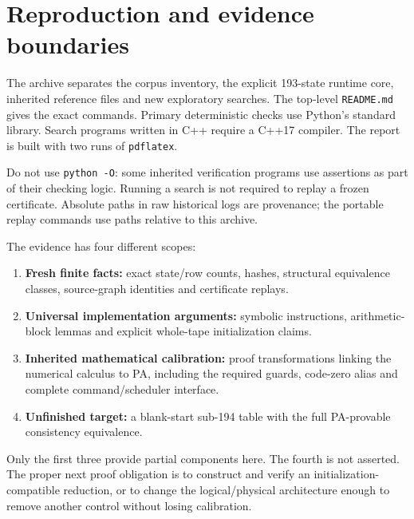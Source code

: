 \documentclass[11pt,letterpaper]{article}
\newcommand{\file}[1]{\texttt{\nolinkurl{#1}}}
\begin{document}
\section{Reproduction and evidence boundaries}

The archive separates the corpus inventory, the explicit 193-state runtime
core, inherited reference files and new exploratory searches. The top-level
\file{README.md} gives the exact commands. Primary deterministic checks use
Python's standard library. Search programs written in C++ require a C++17
compiler. The report is built with two runs of \file{pdflatex}.

Do not use \file{python -O}: some inherited verification programs use
assertions as part of their checking logic. Running a search is not required
to replay a frozen certificate. Absolute paths in raw historical logs are
provenance; the portable replay commands use paths relative to this archive.

The evidence has four different scopes:
\begin{enumerate}
\item \textbf{Fresh finite facts:} exact state/row counts, hashes, structural
      equivalence classes, source-graph identities and certificate replays.
\item \textbf{Universal implementation arguments:} symbolic instructions,
      arithmetic-block lemmas and explicit whole-tape initialization claims.
\item \textbf{Inherited mathematical calibration:} proof transformations
      linking the numerical calculus to PA, including the required guards,
      code-zero alias and complete command/scheduler interface.
\item \textbf{Unfinished target:} a blank-start sub-194 table with the full
      PA-provable consistency equivalence.
\end{enumerate}
Only the first three provide partial components here. The fourth is not
asserted. The proper next proof obligation is to construct and verify an
initialization-compatible reduction, or to change the logical/physical
architecture enough to remove another control without losing calibration.
\end{document}
